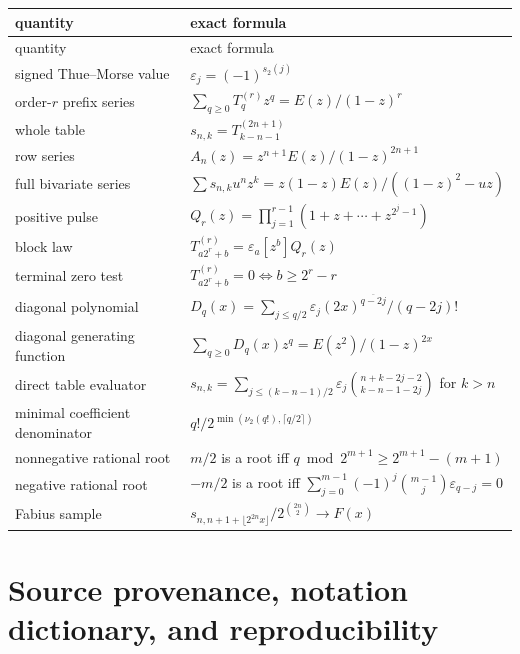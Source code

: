 \documentclass[11pt,a4paper,oneside,openany]{book}
\numberwithin{equation}{chapter}
\theoremstyle{definition}
\theoremstyle{remark}
\newcommand{\eps}{\varepsilon}
\newcommand{\K}{E}
\newcommand{\wt}{s_2}
\newcommand{\rising}[2]{#1^{\overline{#2}}}
\newcommand{\vTwo}{\nu_2}
\newcommand{\Diag}{D}
\newcommand{\A}{Q}
\begin{document}
\begin{longtable}{p{}p{}}
\toprule
quantity & exact formula \\
\midrule
\endfirsthead
\toprule
quantity & exact formula \\
\midrule
\endhead
signed Thue--Morse value
& \(\eps_j=(-1)^{\wt(j)}\) \\
order-\(r\) prefix series
& \(\sum_{q\geq0}T_{q}^{(r)}z^q=\K(z)/(1-z)^r\) \\
whole table
& \(s_{n,k}=T_{k-n-1}^{(2n+1)}\) \\
row series
& \(A_n(z)=z^{n+1}\K(z)/(1-z)^{2n+1}\) \\
full bivariate series
& \(\sum s_{n,k}u^nz^k=z(1-z)\K(z)/((1-z)^2-uz)\) \\
positive pulse
& \(\A_r(z)=\prod_{j=1}^{r-1}(1+z+\cdots+z^{2^j-1})\) \\
block law
& \(T_{a2^r+b}^{(r)}=\eps_a[z^b]\A_r(z)\) \\
terminal zero test
& \(T_{a2^r+b}^{(r)}=0\iff b\geq2^r-r\) \\
diagonal polynomial
& \(\Diag_q(x)=\sum_{j\leq q/2}\eps_j\rising{(2x)}{q-2j}/(q-2j)!\) \\
diagonal generating function
& \(\sum_{q\geq0}\Diag_q(x)z^q=\K(z^2)/(1-z)^{2x}\) \\
direct table evaluator
& \(s_{n,k}=\sum_{j\leq(k-n-1)/2}\eps_j
\binom{n+k-2j-2}{k-n-1-2j}\) for \(k>n\) \\
minimal coefficient denominator
& \(q!/2^{\min(\vTwo(q!),\lceil q/2\rceil)}\) \\
nonnegative rational root
& \(m/2\) is a root iff
\(q\bmod2^{m+1}\geq2^{m+1}-(m+1)\) \\
negative rational root
& \(-m/2\) is a root iff
\(\sum_{j=0}^{m-1}(-1)^j\binom{m-1}{j}\eps_{q-j}=0\) \\
Fabius sample
& \(s_{n,n+1+\lfloor2^{2n}x\rfloor}/2^{\binom{2n}{2}}\to F(x)\) \\
\bottomrule
\end{longtable}

\chapter{Source provenance, notation dictionary, and reproducibility}
\label{app:provenance}
\end{document}
